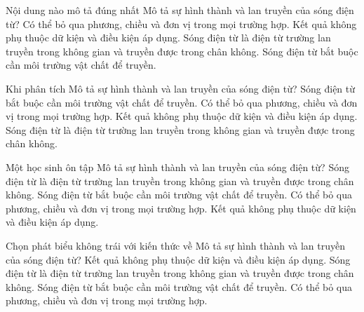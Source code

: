 \begin{ex}
Nội dung nào mô tả đúng nhất Mô tả sự hình thành và lan truyền của sóng điện từ?
\choice
{Có thể bỏ qua phương, chiều và đơn vị trong mọi trường hợp.}
{Kết quả không phụ thuộc dữ kiện và điều kiện áp dụng.}
{\True Sóng điện từ là điện từ trường lan truyền trong không gian và truyền được trong chân không.}
{Sóng điện từ bắt buộc cần môi trường vật chất để truyền.}
\end{ex}

\begin{ex}
Khi phân tích Mô tả sự hình thành và lan truyền của sóng điện từ?
\choice
{Sóng điện từ bắt buộc cần môi trường vật chất để truyền.}
{Có thể bỏ qua phương, chiều và đơn vị trong mọi trường hợp.}
{Kết quả không phụ thuộc dữ kiện và điều kiện áp dụng.}
{\True Sóng điện từ là điện từ trường lan truyền trong không gian và truyền được trong chân không.}
\end{ex}

\begin{ex}
Một học sinh ôn tập Mô tả sự hình thành và lan truyền của sóng điện từ?
\choice
{\True Sóng điện từ là điện từ trường lan truyền trong không gian và truyền được trong chân không.}
{Sóng điện từ bắt buộc cần môi trường vật chất để truyền.}
{Có thể bỏ qua phương, chiều và đơn vị trong mọi trường hợp.}
{Kết quả không phụ thuộc dữ kiện và điều kiện áp dụng.}
\end{ex}

\begin{ex}
Chọn phát biểu không trái với kiến thức về Mô tả sự hình thành và lan truyền của sóng điện từ?
\choice
{Kết quả không phụ thuộc dữ kiện và điều kiện áp dụng.}
{\True Sóng điện từ là điện từ trường lan truyền trong không gian và truyền được trong chân không.}
{Sóng điện từ bắt buộc cần môi trường vật chất để truyền.}
{Có thể bỏ qua phương, chiều và đơn vị trong mọi trường hợp.}
\end{ex}

